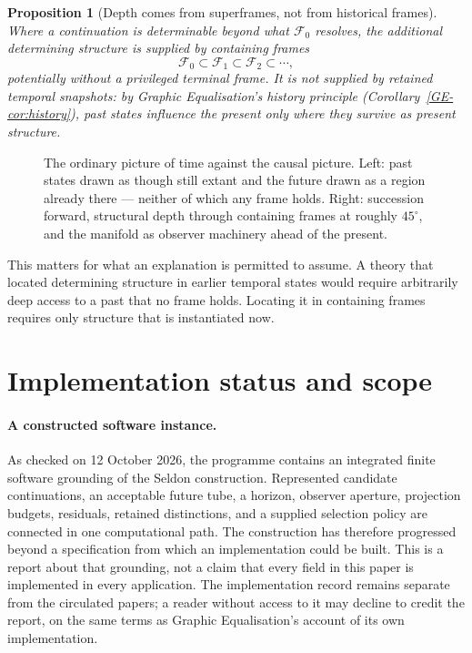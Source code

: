 \documentclass[11pt,a4paper]{article}
\newtheorem{proposition}[definition]{Proposition}
\theoremstyle{remark}
\newcommand{\Frame}{\mathcal F}
\begin{document}
\begin{proposition}[Depth comes from superframes, not from historical frames]\label{prop:superframes}
Where a continuation is determinable beyond what $\Frame_0$ resolves, the additional determining structure is supplied by containing frames
\[
\Frame_0\subset\Frame_1\subset\Frame_2\subset\cdots,
\]
potentially without a privileged terminal frame. It is \emph{not} supplied by retained temporal snapshots: by Graphic Equalisation's history principle (Corollary~\ref{GE-cor:history}), past states influence the present only where they survive as present structure.
\end{proposition}

\begin{figure}[t]
\centering
\resizebox{\textwidth}{!}{}
\caption{The ordinary picture of time against the causal picture. Left: past
states drawn as though still extant and the future drawn as a region already
there --- neither of which any frame holds. Right: succession forward,
structural depth through containing frames at roughly $45^{\circ}$, and the
manifold as observer machinery ahead of the present.}
\label{fig:tilt}
\end{figure}

This matters for what an explanation is permitted to assume. A theory that located determining structure in earlier temporal states would require arbitrarily deep access to a past that no frame holds. Locating it in containing frames requires only structure that is instantiated now.

\section{Implementation status and scope}\label{sec:implementation}

\paragraph{A constructed software instance.}
As checked on 12 October 2026, the programme contains an integrated finite software
grounding of the Seldon construction. Represented candidate continuations, an acceptable
future tube, a horizon, observer aperture, projection budgets, residuals, retained
distinctions, and a supplied selection policy are connected in one computational path.
The construction has therefore progressed beyond a specification from which an
implementation could be built. This is a report about that grounding, not a claim that
every field in this paper is implemented in every application. The implementation
record remains separate from the circulated papers; a reader without access to it may
decline to credit the report, on the same terms as Graphic Equalisation's account of
its own implementation.
\end{document}
